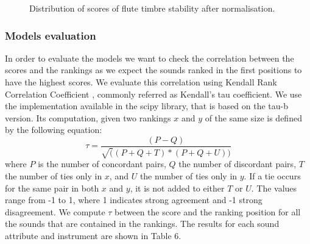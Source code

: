 \documentclass{article}
\begin{document}
\begin{figure}[ht]
 \centerline{}
 \caption{Distribution of scores of flute timbre stability after normalisation.}
 \label{fig:scores_2}
\end{figure}

\subsubsection{Models evaluation}
In order to evaluate the models we want to check the correlation between the scores and the rankings as we expect the sounds ranked in the first positions to have the highest scores. We evaluate this correlation using Kendall Rank Correlation Coefficient \cite{09}, commonly referred as Kendall’s tau coefficient. 
We use the implementation available in the scipy library, that is based on the tau-b version. Its computation, given two rankings $x$ and $y$ of the same size  is defined by the following equation:
\begin{equation}
\tau = \frac{(P - Q)} {\sqrt((P + Q + T)*(P + Q + U))}
\end{equation}
where $P$ is the number of concordant pairs, $Q$ the number of discordant pairs, $T$ the number of ties only in $x$, and $U$ the number of ties only in $y$. If a tie occurs for the same pair in both $x$ and $y$, it is not added to either $T$ or $U$.
The values range from -1 to 1, where 1 indicates strong agreement and -1 strong disagreement. 
We compute $\tau$ between the score and the ranking position for all the sounds that are contained in the rankings. 
The results for each sound attribute and instrument are shown in Table 6.
\end{document}
